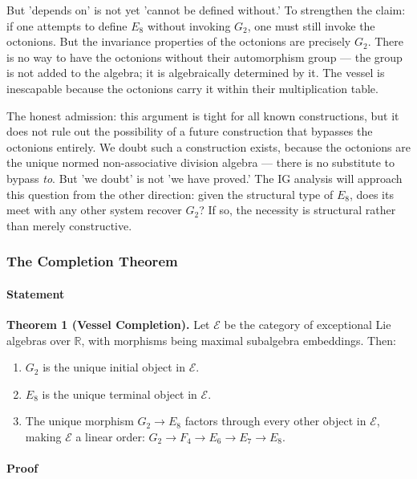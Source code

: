 \documentclass[12pt,a4paper]{article}
\begin{document}
But 'depends on' is not yet 'cannot be defined without.' To strengthen the claim: if one attempts to define $E_8$ without invoking $G_2$, one must still invoke the octonions. But the invariance properties of the octonions are precisely $G_2$. There is no way to have the octonions without their automorphism group --- the group is not added to the algebra; it is algebraically determined by it. The vessel is inescapable because the octonions carry it within their multiplication table.

The honest admission: this argument is tight for all known constructions, but it does not rule out the possibility of a future construction that bypasses the octonions entirely. We doubt such a construction exists, because the octonions are the unique normed non-associative division algebra --- there is no substitute to bypass \emph{to}. But 'we doubt' is not 'we have proved.' The IG analysis will approach this question from the other direction: given the structural type of $E_8$, does its meet with any other system recover $G_2$? If so, the necessity is structural rather than merely constructive.

\subsubsection{The Completion Theorem}

\paragraph{Statement}

\textbf{Theorem 1 (Vessel Completion).} Let $\mathcal{E}$ be the category of exceptional Lie algebras over $\mathbb{R}$, with morphisms being maximal subalgebra embeddings. Then:

\begin{enumerate}
    \item $G_2$ is the unique initial object in $\mathcal{E}$.
    \item $E_8$ is the unique terminal object in $\mathcal{E}$.
    \item The unique morphism $G_2 \to E_8$ factors through every other object in $\mathcal{E}$, making $\mathcal{E}$ a linear order: $G_2 \to F_4 \to E_6 \to E_7 \to E_8$.
\end{enumerate}

\paragraph{Proof}
\end{document}
